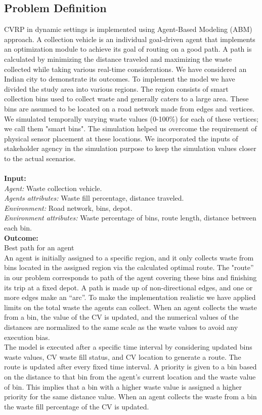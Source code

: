 \documentclass[12pt]{article}
\begin{document}
\subsection{Problem Definition}
CVRP in dynamic settings is implemented using Agent-Based Modeling (ABM) approach. A collection vehicle is an individual goal-driven agent that implements an optimization module to achieve its goal of routing on a good path. A path is calculated by minimizing the distance traveled and maximizing the waste collected while taking various real-time considerations. We have considered an Indian city to demonstrate its outcomes. To implement the model we have divided the study area into various regions. The region consists of smart collection bins used to collect waste and generally caters to a large area. These bins are assumed to be located on a road network made from edges and vertices. We simulated temporally varying waste values (0-100\%) for each of these vertices; we call them "smart bins". The simulation helped us overcome the requirement of physical sensor placement at these locations. We incorporated the inputs of stakeholder agency in the simulation purpose to keep the simulation values closer to the actual scenarios.\\
\\
\textbf{Input:}\\
\textit {Agent:} Waste collection vehicle.\\
\textit {Agents attributes:} Waste fill percentage, distance traveled.  \\
\textit {Environment:} Road network, bins, depot.  \\
\textit {Environment attributes:} Waste percentage of bins, route length, distance between each bin.\\
\textbf{Outcome:}\\
Best path for an agent\\

An agent is initially assigned to a specific region, and it only collects waste from bins located in the assigned region via the calculated optimal route. The "route” in our problem corresponds to path of the agent covering these bins and finishing its trip at a fixed depot. A path is made up of non-directional edges, and one or more edges make an “arc”. To make the implementation realistic we have applied limits on the total waste the agents can collect. When an agent collects the waste from a bin, the value of the CV is updated, and the numerical values of the distances are normalized to the same scale as the waste values to avoid any execution bias.\\ The model is executed after a specific time interval by considering updated bins waste values, CV waste fill status, and CV location to generate a route. The route is updated after every fixed time interval. A priority is given to a bin based on the distance to that bin from the agent's current location and the waste value of bin. This implies that a bin with a higher waste value is assigned a higher priority for the same distance value. When an agent collects the waste from a bin the waste fill percentage of the CV is updated.\\ 
\end{document}
